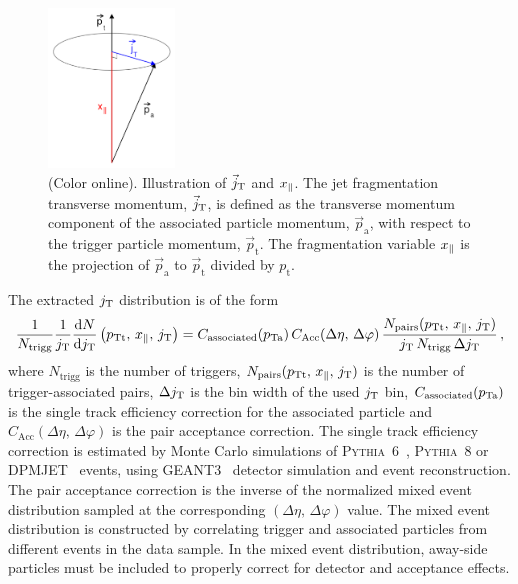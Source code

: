   \begin{figure}
    \begin{center}
      \includegraphics[width = 0.30\textwidth]{figures/jtwithrightangle}
    \end{center}
    \caption{(Color online). Illustration of $\vec{j}_{\rm T}$ and $x_{\parallel}$. The jet fragmentation transverse momentum, $\vec{j}_{\rm T}$, is defined as the transverse momentum component of the associated particle momentum, $\vec{p}_{\mathrm{a}}$, with respect to the trigger particle momentum, $\vec{p}_{\mathrm{t}}$. The fragmentation variable $x_{\parallel}$ is the projection of $\vec{p}_{\mathrm{a}}$ to $\vec{p}_{\mathrm{t}}$ divided by $p_{\mathrm{t}}$.}
    \label{fig:jtdefinition}
  \end{figure}

The extracted $j_{\rm T}$ distribution is of the form
\begin{equation}
  \frac{1}{N_{\mathrm{trigg}}} \frac{1}{j_{\rm T}} \frac{\mathrm{d}N}{\mathrm{d}j_{\rm T}} \left(p_{\rm Tt},\,x_{\parallel},\,j_{\rm T}\right)= C_{\mathrm{associated}}(p_{\rm Ta}) \, C_{\mathrm{Acc}}(\Delta\eta,\,\Delta\varphi) \, \frac{N_{\mathrm{pairs}}(p_{\rm Tt},\,x_{\parallel},\,j_{\rm T}) }{j_{\rm T} \, N_{\mathrm{trigg}} \, \Delta j_{\rm T}} \,,
  \label{eq:exactDistribution}
\end{equation}
where $N_{\mathrm{trigg}}$ is the number of triggers, $N_{\mathrm{pairs}}(p_{\rm Tt},\,x_{\parallel},\,j_{\rm T})$ is the number of trigger-associated pairs, $\Delta j_{\rm T}$ is the bin width of the used $j_{\rm T}$ bin, $C_{\mathrm{associated}}(p_{\rm Ta})$ is the single track efficiency correction for the associated particle and $C_{\mathrm{Acc}}(\Delta\eta,\,\Delta\varphi)$ is the pair acceptance correction. The single track efficiency correction is estimated by Monte Carlo simulations of \textsc{Pythia}~6~\cite{pythiaBig}, \textsc{Pythia}~8 or DPMJET~\cite{dpmjet} events, using GEANT3~\cite{geant} detector simulation and event reconstruction. The pair acceptance correction is the inverse of the normalized mixed event distribution sampled at the corresponding $(\Delta\eta,\,\Delta\varphi)$ value. The mixed event distribution is constructed by correlating trigger and associated particles from different events in the data sample. In the mixed event distribution, away-side particles must be included to properly correct for detector and acceptance effects.

